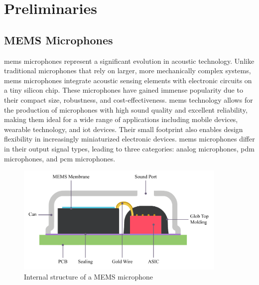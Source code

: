 \chapter{Preliminaries}
\section{MEMS Microphones}
\label{sec:mems_microphones}
\acrfull{mems} microphones represent a significant evolution in acoustic technology.
Unlike traditional microphones that rely on larger, more mechanically complex systems,
\acrshort{mems} microphones integrate acoustic sensing elements with electronic circuits on a tiny silicon chip.
These microphones have gained immense popularity due to their compact size, robustness, and cost-effectiveness.
\acrshort{mems} technology allows for the production of microphones with high sound quality and excellent reliability,
making them ideal for a wide range of applications including mobile devices, wearable technology, and \acrshort{iot} devices.
Their small footprint also enables design flexibility in increasingly miniaturized electronic devices.
\acrshort{mems} microphones differ in their output signal types, leading to three categories: analog microphones, \acrshort{pdm} microphones, and \acrshort{pcm} microphones.
\begin{figure}[h]
	\centering
	\includegraphics[width=0.9\textwidth]{images/2_preliminaries/mems_microphone_illustration.pdf}
	\caption{Internal structure of a MEMS microphone}
	\label{fig:mems_microphone}
\end{figure}

